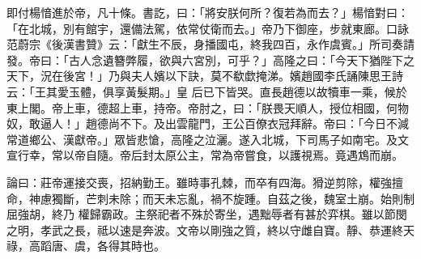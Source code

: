 \begin{pinyinscope}
 即付楊愔進於帝，凡十條。書訖，曰：「將安朕何所？復若為而去？」楊愔對曰：「在北城，別有館宇，還備法駕，依常仗衛而去。」帝乃下御座，步就東廊。口詠范蔚宗《後漢書贊》云：「獻生不辰，身播國屯，終我四百，永作虞賓。」所司奏請發。帝曰：「古人念遺簪弊履，欲與六宮別，可乎？」高隆之曰：「今天下猶陛下之天下，況在後宮！」乃與夫人嬪以下訣，莫不欷歔掩涕。嬪趙國李氏誦陳思王詩云：「王其愛玉體，俱享黃髮期。」皇
 后已下皆哭。直長趙德以故犢車一乘，候於東上閣。帝上車，德超上車，持帝。帝肘之，曰：「朕畏天順人，授位相國，何物奴，敢逼人！」趙德尚不下。及出雲龍門，王公百僚衣冠拜辭。帝曰：「今日不減常道鄉公、漢獻帝。」眾皆悲愴，高隆之泣灑。遂入北城，下司馬子如南宅。及文宣行幸，常以帝自隨。帝后封太原公主，常為帝嘗食，以護視焉。竟遇鴆而崩。



 論曰：莊帝運接交喪，招納勤王。雖時事孔棘，而卒有四海。猾逆剪除，權強擅命，神慮獨斷，芒刺未除；而天未忘亂，禍不旋踵。自茲之後，魏室土崩。始則制屈強胡，終乃
 權歸霸政。主祭祀者不殊於寄坐，遇黜辱者有甚於弈棋。雖以節閔之明，孝武之長，祗以速是奔波。文帝以剛強之質，終以守雌自寶。靜、恭運終天祿，高蹈唐、虞，各得其時也。



\end{pinyinscope}